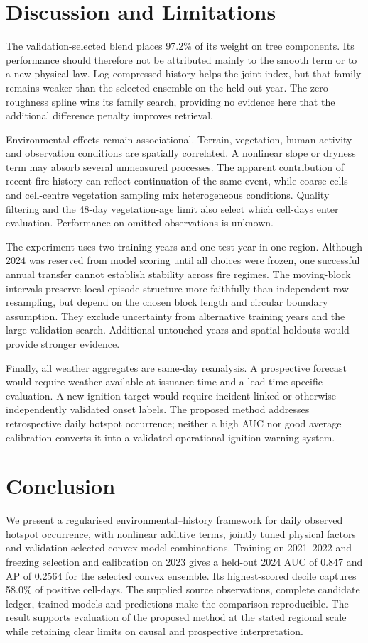 \documentclass[conference]{IEEEtran}
\begin{document}
\section{Discussion and Limitations}
The validation-selected blend places 97.2\% of its weight on tree components. Its performance should therefore not be attributed mainly to the smooth term or to a new physical law. Log-compressed history helps the joint index, but that family remains weaker than the selected ensemble on the held-out year. The zero-roughness spline wins its family search, providing no evidence here that the additional difference penalty improves retrieval.

Environmental effects remain associational. Terrain, vegetation, human activity and observation conditions are spatially correlated. A nonlinear slope or dryness term may absorb several unmeasured processes. The apparent contribution of recent fire history can reflect continuation of the same event, while coarse cells and cell-centre vegetation sampling mix heterogeneous conditions. Quality filtering and the 48-day vegetation-age limit also select which cell-days enter evaluation. Performance on omitted observations is unknown.

The experiment uses two training years and one test year in one region. Although 2024 was reserved from model scoring until all choices were frozen, one successful annual transfer cannot establish stability across fire regimes. The moving-block intervals preserve local episode structure more faithfully than independent-row resampling, but depend on the chosen block length and circular boundary assumption. They exclude uncertainty from alternative training years and the large validation search. Additional untouched years and spatial holdouts would provide stronger evidence.

Finally, all weather aggregates are same-day reanalysis. A prospective forecast would require weather available at issuance time and a lead-time-specific evaluation. A new-ignition target would require incident-linked or otherwise independently validated onset labels. The proposed method addresses retrospective daily hotspot occurrence; neither a high AUC nor good average calibration converts it into a validated operational ignition-warning system.

\section{Conclusion}
We present a regularised environmental--history framework for daily observed hotspot occurrence, with nonlinear additive terms, jointly tuned physical factors and validation-selected convex model combinations. Training on 2021--2022 and freezing selection and calibration on 2023 gives a held-out 2024 AUC of 0.847 and AP of 0.2564 for the selected convex ensemble. Its highest-scored decile captures 58.0\% of positive cell-days. The supplied source observations, complete candidate ledger, trained models and predictions make the comparison reproducible. The result supports evaluation of the proposed method at the stated regional scale while retaining clear limits on causal and prospective interpretation.
\end{document}
